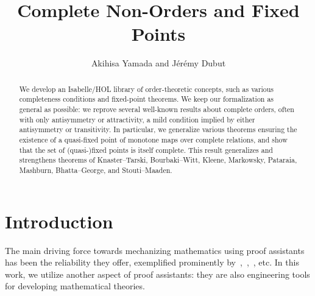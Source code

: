 \documentclass[11pt,a4paper]{article}
\begin{document}
\title{Complete Non-Orders and Fixed Points}
\author{Akihisa Yamada and J\'er\'emy Dubut}
\maketitle

\begin{abstract}
We develop an Isabelle/HOL library
of order-theoretic concepts, such as various completeness conditions and
fixed-point theorems.
We keep our formalization as general as possible:
we reprove several well-known results about complete orders,
often with only antisymmetry or attractivity, a mild condition implied by either 
antisymmetry or transitivity.
In particular, we generalize various theorems ensuring
the existence of a quasi-fixed point of monotone maps over complete relations,
and show that the set of (quasi-)fixed points is itself complete.
This result generalizes and strengthens theorems of Knaster--Tarski, Bourbaki--Witt, Kleene, Markowsky, Pataraia, Mashburn, Bhatta--George, and Stouti--Maaden.
\end{abstract}

\tableofcontents

\section{Introduction}

The main driving force towards mechanizing mathematics using proof assistants
has been the reliability they offer,
%
exemplified prominently by~\cite{4color},~\cite{flyspeck},~\cite{sel4}, etc.
In this work, we utilize another aspect of proof assistants:
they are also engineering tools for developing mathematical theories.
\end{document}
